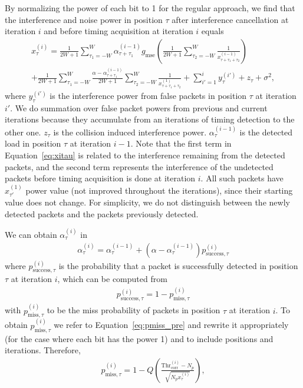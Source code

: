 \documentclass[journal,onecolumn,12pt]{IEEEtran}
\begin{document}
By normalizing the power of each bit to 1 for the regular approach, we find that the interference and noise power in position $\tau$ after interference cancellation at iteration $i$ and before timing acquisition at iteration $i$ equals 
\begin{multline}
x_{\tau}^{(i)} = \frac{1}{2W+1}  \sum_{\tau_1=-W}^{W} \alpha^{(i-1)}_{\tau+\tau_1} g_{\text{mse}} \left(\frac{1}{2W+1}\sum_{\tau_2=-W}^{W}\frac{1}{x_{\tau+\tau_1+\tau_2}^{(i-1)}}\right)\\
+\frac{1}{2W+1} \sum_{\tau_1=-W}^{W}  \frac{\alpha-\alpha^{(i-1)}_{\tau+\tau_1}}{2W+1}\sum_{\tau_2=-W}^{W}\frac{1}{x_{\tau+\tau_1+\tau_2}^{(1)}} + \sum_{i'=1}^{i} y_{\tau}^{(i')} + z_{\tau} + \sigma^2, \label{eq:xitau}
\end{multline}
where $y_{\tau}^{(i')}$ is the interference power from false packets in position $\tau$ at iteration $i'$. We do summation over false packet powers from previous and current iterations because they accumulate from an iterations of timing detection to the other one. $z_{\tau}$ is the collision induced interference power. $\alpha_{\tau}^{(i-1)}$ is the detected load in position $\tau$ at iteration $i-1$. Note that the first term in Equation~\ref{eq:xitau} is related to the interference remaining from the detected packets, and the second term represents the interference of the undetected packets before timing acquisition is done at iteration $i$. All such packets have $x_{\tau'}^{(1)}$ power value (not improved throughout the iterations), since their starting value does not change. For simplicity, we do not distinguish between the newly detected packets and the packets previously detected. 

We can obtain $\alpha^{(i)}_{\tau}$ in
\begin{align}
\alpha^{(i)}_{\tau} = \alpha^{(i-1)}_{\tau} + \left(\alpha-\alpha^{(i-1)}_{\tau}\right)p_{\text{success},\tau}^{(i)}\label{eq:alpha1}
\end{align}
where $p_{\text{success},\tau}^{(i)}$ is the probability that a packet is successfully detected in position $\tau$ at iteration $i$, which can be computed from
\begin{align}
p_{\text{success},\tau}^{(i)} = 1 - p_{\text{miss},\tau}^{(i)}
\end{align}
with $p_{\text{miss},\tau}^{(i)}$ to be the miss probability of packets in position $\tau$ at iteration $i$. To obtain $p_{\text{miss},\tau}^{(i)}$ we refer to Equation~\ref{eq:pmiss_pre} and rewrite it appropriately (for the case where each bit has the power 1) and to include positions and iterations. Therefore,
\begin{align}
p_{\text{miss},\tau}^{(i)} = 1 - Q \left( \frac{\text{Thr}_{\text{corr}}^{(i)}-N_p}{\sqrt{N_p x_{\tau}^{(i)}}}\right), \label{eq:pmiss_pre_positer}
\end{align}
\end{document}
